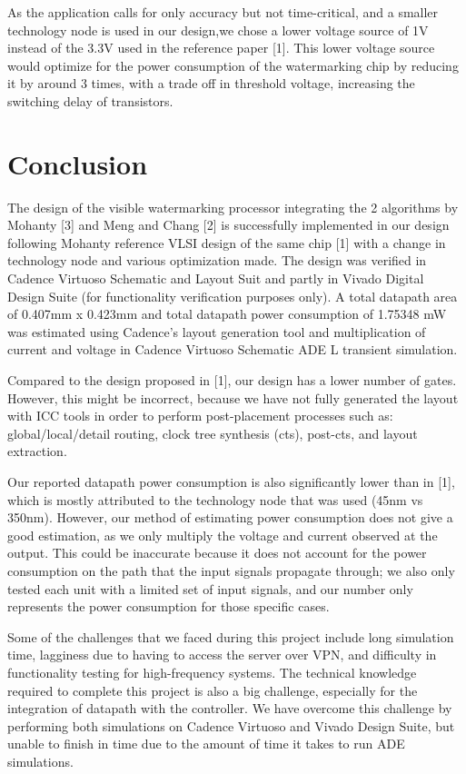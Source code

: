 \documentclass[letterpaper, 11pt]{article}
\begin{document}
	As the application calls for only accuracy but not time-critical, and a smaller technology node is used in our design,we chose a lower voltage source of 1V instead of the 3.3V used in the reference paper [1]. This lower voltage source would optimize for the power consumption of the watermarking chip by reducing it by around 3 times, with a trade off in threshold voltage, increasing the switching delay of transistors. 
	
	\newpage 
	\section{Conclusion}
	\label{sec:conclusion}
	The design of the visible watermarking processor integrating the 2 algorithms by Mohanty [3] and Meng and Chang [2] is successfully implemented in our design following Mohanty reference VLSI design of the same chip [1] with a change in technology node and various optimization made. The design was verified in Cadence Virtuoso Schematic and Layout Suit and partly in Vivado Digital Design Suite (for functionality verification purposes only). A total datapath area of 0.407mm x 0.423mm and total datapath power consumption of 1.75348 mW  was estimated using Cadence's layout generation tool and multiplication of current and voltage in Cadence Virtuoso Schematic ADE L transient simulation.
	
	Compared to the design proposed in [1], our design has a lower number of gates. However, this might be incorrect, because we have not fully generated the layout with ICC tools in order to perform post-placement processes such as: global/local/detail routing, clock tree synthesis (cts), post-cts, and layout extraction.
	
	Our reported datapath power consumption is also significantly lower than in [1], which is mostly attributed to the technology node that was used (45nm vs 350nm). However, our method of estimating power consumption does not give a good estimation, as we only multiply the voltage and current observed at the output. This could be inaccurate because it does not account for the power consumption on the path that the input signals propagate through; we also only tested each unit with a limited set of input signals, and our number only represents the power consumption for those specific cases.
	
	Some of the challenges that we faced during this project include long simulation time, lagginess due to having to access the server over VPN, and difficulty in functionality testing for high-frequency systems. The technical knowledge required to complete this project is also a big challenge, especially for the integration of datapath with the controller. We have overcome this challenge by performing both simulations on Cadence Virtuoso and Vivado Design Suite, but unable to finish in time due to the amount of time it takes to run ADE simulations.
	
\end{document}
